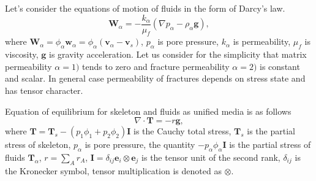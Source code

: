 \documentclass[article,authoryear,jpm]{beg_39}             %
\begin{document}
Let’s consider the equations of motion of fluids in the form of Darcy’s law.
\begin{equation}
{{\mathbf{W}}_{\alpha }}=-\frac{{{k}_{\alpha }}}{{{\mu }_{f}}}\left( \nabla {{p}_{\alpha }}-{{\rho }_{\alpha }}\mathbf{g} \right),
\end{equation}
where ${{\mathbf{W}}_{\alpha }}={{\phi }_{\alpha }}{{\mathbf{w}}_{\alpha }}={{\phi }_{\alpha }}\left( {{\mathbf{v}}_{\alpha }}-{{\mathbf{v}}_{s}} \right)$, ${{p}_{\alpha }}$ is pore pressure, ${{k}_{\alpha }}$ is permeability, ${{\mu }_{f}}$ is viscosity, $\mathbf{g}$ is gravity acceleration. Let us consider for the simplicity that matrix permeability ${\alpha}=1)$ tends to zero and fracture permeability ${\alpha}=2)$ is constant and scalar. In general case permeability of fractures depends on stress state and has tensor character.

Equation of equilibrium for skeleton and fluids as unified media is as follows
\begin{equation}
\nabla \cdot \mathbf{T}=-r\mathbf{g},
\end{equation}
where $\mathbf{T}={{\mathbf{T}}_{s}}-\left( {{p}_{1}}{{\phi }_{1}}+{{p}_{2}}{{\phi }_{2}} \right)\mathbf{I}$ is the Cauchy total stress, ${{\mathbf{T}}_{s}}$ is the partial stress of skeleton, ${{p}_{\alpha }}$ is pore pressure, the quantity $-{{p}_{\alpha }}{{\phi }_{\alpha }}\mathbf{I}$ is the partial stress of fluids ${{\mathbf{T}}_{\alpha }}$, $r=\sum\limits_{A}{{{r}_{A}}}$, $\mathbf{I}={{\delta }_{ij}}{{\mathbf{e}}_{i}}\otimes {{\mathbf{e}}_{j}}$ is the tensor unit of the second rank, ${{\delta }_{ij}}$ is the Kronecker symbol, tensor multiplication is denoted as $\otimes$.
\end{document}
